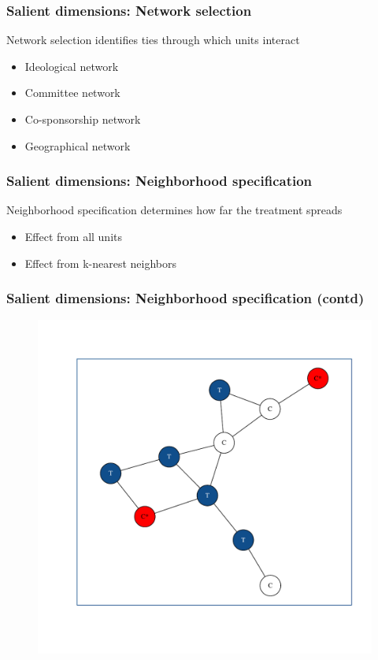 \documentclass{beamer}
\begin{document}
\begin{frame}
\frametitle{Salient dimensions: Network selection}
{\LARGE Network selection identifies ties through which units interact}
\vspace{5mm}
\begin{itemize}
\item {\Large Ideological network}
\vspace{5mm}
\item {\Large Committee network}
\vspace{5mm}
\item {\Large Co-sponsorship network}
\vspace{5mm}
\item {\Large Geographical network}
\end{itemize}
\end{frame}


\begin{frame}
\frametitle{Salient dimensions: Neighborhood specification}
{\LARGE Neighborhood specification determines how far the treatment spreads}
\vspace{5mm}
\begin{itemize}
\item {\Large Effect from all units}
\vspace{5mm}
\item {\Large Effect from k-nearest neighbors} 
\end{itemize}
\end{frame}

\begin{frame}
\frametitle{Salient dimensions: Neighborhood specification (contd)}
\vspace{-8mm}
\begin{figure}
\centering
\includegraphics[trim = 11mm 0mm 9mm 0mm, clip, scale = 0.5]{knn_network_plot.pdf}
\end{figure}
\end{frame}
\end{document}

